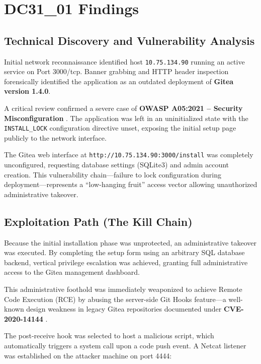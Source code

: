 \documentclass[11pt,a4paper]{article}
\begin{document}

\section{DC31\_01 Findings}

\subsection{Technical Discovery and Vulnerability Analysis}

Initial network reconnaissance identified host \texttt{10.75.134.90} running an active service on Port 3000/tcp. Banner grabbing and HTTP header inspection forensically identified the application as an outdated deployment of \textbf{Gitea version 1.4.0}.

A critical review confirmed a severe case of \textbf{OWASP A05:2021 -- Security Misconfiguration} \citep{OWASP2021}. The application was left in an uninitialized state with the \texttt{INSTALL\_LOCK} configuration directive unset, exposing the initial setup page publicly to the network interface.

The Gitea web interface at \texttt{http://10.75.134.90:3000/install} was completely unconfigured, requesting database settings (SQLite3) and admin account creation. This vulnerability chain—failure to lock configuration during deployment—represents a ``low-hanging fruit'' access vector allowing unauthorized administrative takeover.

\subsection{Exploitation Path (The Kill Chain)}

Because the initial installation phase was unprotected, an administrative takeover was executed. By completing the setup form using an arbitrary SQL database backend, vertical privilege escalation was achieved, granting full administrative access to the Gitea management dashboard.

This administrative foothold was immediately weaponized to achieve Remote Code Execution (RCE) by abusing the server-side Git Hooks feature—a well-known design weakness in legacy Gitea repositories documented under \textbf{CVE-2020-14144} \citep{NVD2019}.

The post-receive hook was selected to host a malicious script, which automatically triggers a system call upon a code push event. A Netcat listener was established on the attacker machine on port 4444:
\end{document}
